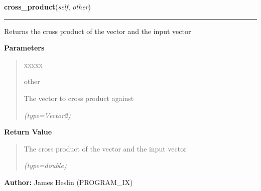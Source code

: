     \vspace{0.5ex}

\hspace{.8\funcindent}\begin{boxedminipage}{\funcwidth}

    \raggedright \textbf{cross\_product}(\textit{self}, \textit{other})

    \vspace{-1.5ex}

    \rule{\textwidth}{0.5\fboxrule}
\setlength{\parskip}{2ex}
    Returns the cross product of the vector and the input vector

\setlength{\parskip}{1ex}
      \textbf{Parameters}
      \vspace{-1ex}

      \begin{quote}
        \begin{Ventry}{xxxxx}

          \item[other]

          The vector to cross product against

            {\it (type=Vector2)}

        \end{Ventry}

      \end{quote}

      \textbf{Return Value}
    \vspace{-1ex}

      \begin{quote}
      The cross product of the vector and the input vector

      {\it (type=double)}

      \end{quote}

\textbf{Author:} James Heslin (PROGRAM\_IX)



    \end{boxedminipage}

    \label{pystroke:vector2:Vector2:clamp}

    \vspace{0.5ex}

